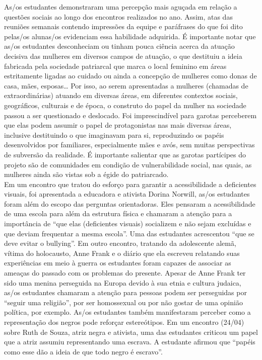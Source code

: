 \documentclass[
]{book}
\begin{document}
As/os estudantes demonstraram uma percepção mais aguçada em relação a questões sociais ao longo dos encontros realizados no ano. Assim, atas das reuniões semanais contendo impressões da equipe e paráfrases do que foi dito pelas/os alunas/os evidenciam essa habilidade adquirida. É importante notar que as/os estudantes desconheciam ou tinham pouca ciência acerca da atuação decisiva das mulheres em diversos campos de atuação, o que destituiu a ideia fabricada pela sociedade patriarcal que marca o local feminino em áreas estritamente ligadas ao cuidado ou ainda a concepção de mulheres como donas de casa, mães, esposas\ldots{} Por isso, ao serem apresentadas a mulheres (chamadas de extraordinárias) atuando em diversas áreas, em diferentes contextos sociais, geográficos, culturais e de época, o construto do papel da mulher na sociedade passou a ser questionado e deslocado. Foi imprescindível para garotas perceberem que elas podem assumir o papel de protagonistas nas mais diversas áreas, inclusive destituindo o que imaginavam para si, reproduzindo os papéis desenvolvidos por familiares, especialmente mães e avós, sem muitas perspectivas de subversão da realidade. É importante salientar que as garotas partícipes do projeto são de comunidades em condição de vulnerabilidade social, nas quais, as mulheres ainda são vistas sob a égide do patriarcado.\\
Em um encontro que tratou do esforço para garantir a acessibilidade a deficientes visuais, foi apresentada a educadora e ativista Dorina Norwill, as/os estudantes foram além do escopo das perguntas orientadoras. Eles pensaram a acessibilidade de uma escola para além da estrutura física e chamaram a atenção para a importância de ``que elas (deficientes visuais) socializem e não sejam excluídas e que deviam frequentar a mesma escola''. Uma das estudantes acrescentou ``que se deve evitar o bullying''.
Em outro encontro, tratando da adolescente alemã, vítima do holocausto, Anne Frank e o diário que ela escreveu relatando suas experiências em meio à guerra os estudantes foram capazes de associar as ameaças do passado com os problemas do presente. Apesar de Anne Frank ter sido uma menina perseguida na Europa devido à sua etnia e cultura judaica, as/os estudantes chamaram a atenção para pessoas podem ser perseguidas por ``seguir uma religião'', por ser homossexual ou por não gostar de uma opinião política, por exemplo.
As/os estudantes também manifestaram perceber como a representação dos negros pode reforçar estereótipos. Em um encontro (24/04) sobre Ruth de Souza, atriz negra e ativista, uma das estudantes criticou um papel que a atriz assumiu representando uma escrava. A estudante afirmou que ``papéis como esse dão a ideia de que todo negro é escravo''.
\end{document}
